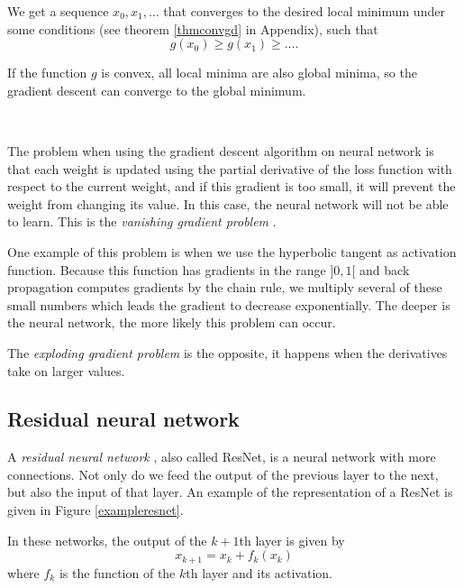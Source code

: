\documentclass[10pt,a4paper]{article}
\theoremstyle{definition}
\theoremstyle{plain}
\begin{document}
We get a sequence $x_0,x_1,\dots$ that converges to the desired local minimum under some conditions (see theorem \ref{thmconvgd} in Appendix), such that
$$
g(x_0) \geq g(x_1) \geq \dots . 
$$

If the function $g$ is convex, all local minima are also global minima, so the gradient descent can converge to the global minimum.

~

The problem when using the gradient descent algorithm on neural network is that each weight is updated using the partial derivative of the loss function with respect to the current weight, and if this gradient is too small, it will prevent the weight from changing its value. In this case, the neural network will not be able to learn. This is the \textit{vanishing gradient problem} \cite{10}.

One example of this problem is when we use the hyperbolic tangent as activation function. Because this function has gradients in the range $]0,1[$ and back propagation computes gradients by the chain rule, we multiply several of these small numbers which leads the gradient to decrease exponentially. The deeper is the neural network, the more likely this problem can occur.

The \textit{exploding gradient problem} is the opposite, it happens when the derivatives take on larger values.


\subsection{Residual neural network} \label{rnn}

A\textit{ residual neural network} \cite{6}, also called ResNet, is a neural network with more connections. Not only do we feed the output of the previous layer to the next, but also the input of that layer. 
An example of the representation of a ResNet is given in Figure \ref{exampleresnet}.

In these networks, the output of the $k+1$th layer is given by
\begin{equation}\label{eqrn}
x_{k+1} = x_k + f_k(x_k)
\end{equation}
where $f_k$ is the function of the $k$th layer and its activation. 
\end{document}
